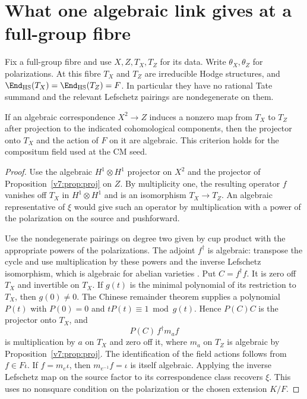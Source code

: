 \section{What one algebraic link gives at a full-group fibre}\label{v7:sec:transfer}

Fix a full-group fibre and use \(X,Z,T_X,T_Z\) for its data. Write \(\theta_X,\theta_Z\) for polarizations. At this fibre \(T_X\) and \(T_Z\) are irreducible Hodge structures, and \(\End_{\mathrm{HS}}(T_X)=\End_{\mathrm{HS}}(T_Z)=F\). In particular they have no rational Tate summand and the relevant Lefschetz pairings are nondegenerate on them.

\begin{proposition}\label{v7:prop:transfer}
If an algebraic correspondence \(X^2\to Z\) induces a nonzero map from \(T_X\) to \(T_Z\) after projection to the indicated cohomological components, then the projector onto \(T_X\) and the action of \(F\) on it are algebraic. This criterion holds for the compositum field used at the CM seed.
\end{proposition}
\begin{proof}
Use the algebraic \(H^1\otimes H^1\) projector on \(X^2\) and the projector of Proposition~\ref{v7:prop:proj} on \(Z\). By multiplicity one, the resulting operator \(f\) vanishes off \(T_X\) in \(H^1\otimes H^1\) and is an isomorphism \(T_X\to T_Z\). An algebraic representative of \(\xi\) would give such an operator by multiplication with a power of the polarization on the source and pushforward.

Use the nondegenerate pairings on degree two given by cup product with the appropriate powers of the polarizations. The adjoint \(f^\dagger\) is algebraic: transpose the cycle and use multiplication by these powers and the inverse Lefschetz isomorphism, which is algebraic for abelian varieties \cite{Kle68}. Put \(C=f^\dagger f\). It is zero off \(T_X\) and invertible on \(T_X\). If \(g(t)\) is the minimal polynomial of its restriction to \(T_X\), then \(g(0)\ne0\). The Chinese remainder theorem supplies a polynomial \(P(t)\) with \(P(0)=0\) and \(tP(t)\equiv1\bmod g(t)\). Hence \(P(C)C\) is the projector onto \(T_X\), and
\[
 P(C)\,f^\dagger m_a f
\]
is multiplication by \(a\) on \(T_X\) and zero off it, where \(m_a\) on \(T_Z\) is algebraic by Proposition~\ref{v7:prop:proj}. The identification of the field actions follows from \(f\in F\iota\). If \(f=m_e\iota\), then \(m_{e^{-1}}f=\iota\) is itself algebraic. Applying the inverse Lefschetz map on the source factor to its correspondence class recovers \(\xi\). This uses no nonsquare condition on the polarization or the chosen extension \(K/F\).
\end{proof}

